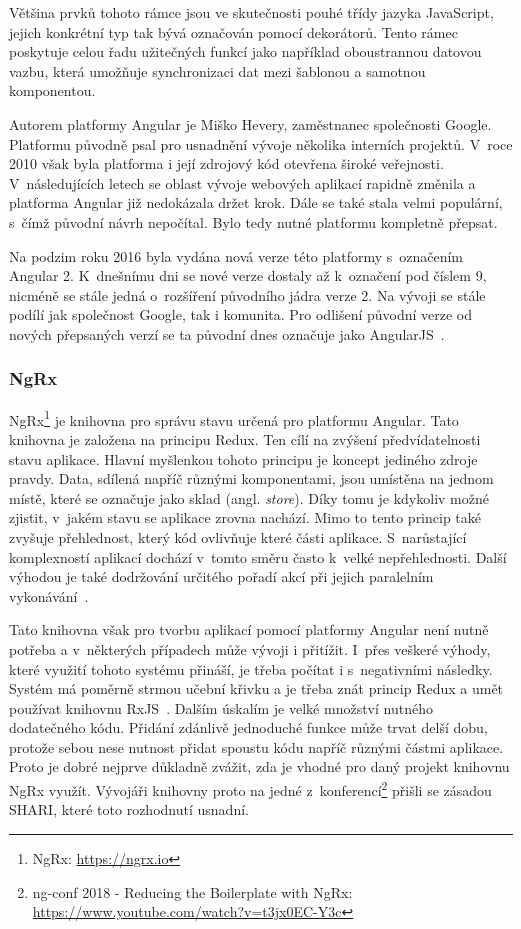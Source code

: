 Většina prvků tohoto rámce jsou ve skutečnosti pouhé třídy jazyka JavaScript, jejich konkrétní typ tak bývá označován pomocí dekorátorů.
Tento rámec poskytuje celou řadu užitečných funkcí jako například oboustrannou datovou vazbu, která umožňuje synchronizaci dat mezi šablonou a samotnou komponentou.

Autorem platformy Angular je Miško Hevery, zaměstnanec společnosti Google. Platformu původně psal pro usnadnění vývoje několika interních projektů. V~roce 2010 však byla platforma i její zdrojový kód otevřena široké veřejnosti. V~následujících letech se oblast vývoje webových aplikací rapidně změnila a platforma Angular již nedokázala držet krok. Dále se také stala velmi populární, s~čímž původní návrh nepočítal. Bylo tedy nutné platformu kompletně přepsat.

Na podzim roku 2016 byla vydána nová verze této platformy s~označením Angular 2. K~dnešnímu dni se nové verze dostaly až k~označení pod číslem 9, nicméně se stále jedná o~rozšíření původního jádra verze 2. Na vývoji se stále podílí jak společnost Google, tak i komunita. Pro odlišení původní verze od nových přepsaných verzí se ta původní dnes označuje jako AngularJS~\cite{bib:angular-history}.

\subsubsection{NgRx}\label{sec:ngrx}
NgRx\footnote{NgRx: \url{https://ngrx.io}} je knihovna pro správu stavu určená pro platformu Angular. Tato knihovna je založena na principu Redux. Ten cílí na zvýšení předvídatelnosti stavu aplikace. Hlavní myšlenkou tohoto principu je koncept jediného zdroje pravdy. Data, sdílená napříč různými komponentami, jsou umístěna na jednom místě, které se označuje jako sklad (angl. \emph{store}). Díky tomu je kdykoliv možné zjistit, v~jakém stavu se aplikace zrovna nachází. Mimo to tento princip také zvyšuje přehlednost, který kód ovlivňuje které části aplikace. S~narůstající komplexností aplikací dochází v~tomto směru často k~velké nepřehlednosti. Další výhodou je také dodržování určitého pořadí akcí při jejich paralelním vykonávání~\cite{bib:ngrx-arch}.

Tato knihovna však pro tvorbu aplikací pomocí platformy Angular není nutně potřeba a v~některých případech může vývoji i přitížit. I~přes veškeré výhody, které využití tohoto systému přináší, je třeba počítat i s~negativními následky. Systém má poměrně strmou učební křivku a je třeba znát princip Redux a umět používat knihovnu RxJS~\cite{bib:ngrx-docs}.
Dalším úskalím je velké množství nutného dodatečného kódu. Přidání zdánlivě jednoduché funkce může trvat delší dobu, protože sebou nese nutnost přidat spoustu kódu napříč různými částmi aplikace. Proto je dobré nejprve důkladně zvážit, zda je vhodné pro daný projekt knihovnu NgRx využít. Vývojáři knihovny proto na jedné z~konferencí\footnote {ng-conf 2018 - Reducing the Boilerplate with NgRx: \url{https://www.youtube.com/watch?v=t3jx0EC-Y3c}} přišli se zásadou SHARI, které toto rozhodnutí usnadní. 

